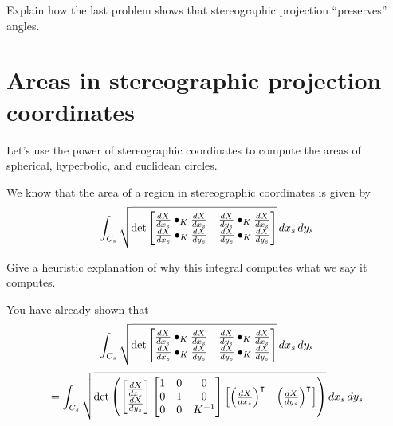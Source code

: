 \documentclass{ximera}
\begin{document}
\begin{problem}
  Explain how the last problem shows that stereographic projection
  ``preserves'' angles. 
\end{problem}




















\section{Areas in stereographic projection coordinates}

Let's use the power of stereographic coordinates to compute the areas
of spherical, hyperbolic, and euclidean circles.

We know that the area of a region in stereographic coordinates is given by 
\[
\int_{C_s} \sqrt{
  \det
  \begin{bmatrix}
    \dd[X]{x_s}\bullet_K \dd[X]{x_s} & \dd[X]{y_s}\bullet_K \dd[X]{x_s} \\
    \dd[X]{x_s}\bullet_K \dd[X]{y_s} & \dd[X]{y_s}\bullet_K \dd[X]{y_s}
  \end{bmatrix}
}\d x_s\d y_s
\]

\begin{problem}
  Give a heuristic explanation of why this integral computes what we
  say it computes.
\end{problem}

You have already shown that
\[
\int_{C_s} \sqrt{
  \det
  \begin{bmatrix}
    \dd[X]{x_s}\bullet_K \dd[X]{x_s} & \dd[X]{y_s}\bullet_K \dd[X]{x_s} \\
    \dd[X]{x_s}\bullet_K \dd[X]{y_s} & \dd[X]{y_s}\bullet_K \dd[X]{y_s}
  \end{bmatrix}
}\d x_s\d y_s
\]
\[
=
\int_{C_s} \sqrt{
  \det\left(
  \begin{bmatrix}
    \dd[X]{x_s}\\
    \dd[X]{y_s}
  \end{bmatrix}
  \begin{bmatrix}
    1 & 0 & 0\\
    0 & 1 & 0\\
    0 & 0 & K^{-1}
  \end{bmatrix}
  \begin{bmatrix}
    \left(\dd[X]{x_s}\right)^\transpose & \left(\dd[X]{y_s}\right)^\transpose
  \end{bmatrix}\right)
}\d x_s\d y_s
\]
\end{document}

